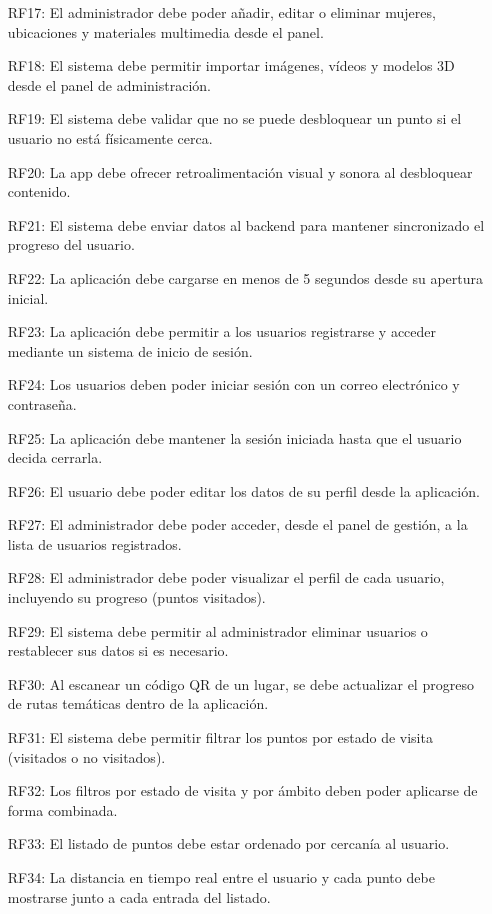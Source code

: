\begin{itemize}
\item[RF17:] El administrador debe poder añadir, editar o eliminar mujeres, ubicaciones y materiales multimedia desde el panel.
\item[RF18:] El sistema debe permitir importar imágenes, vídeos y modelos 3D desde el panel de administración.
\item[RF19:] El sistema debe validar que no se puede desbloquear un punto si el usuario no está físicamente cerca.
\item[RF20:] La app debe ofrecer retroalimentación visual y sonora al desbloquear contenido.
\item[RF21:] El sistema debe enviar datos al backend para mantener sincronizado el progreso del usuario.
\item[RF22:] La aplicación debe cargarse en menos de 5 segundos desde su apertura inicial.
\item[RF23:] La aplicación debe permitir a los usuarios registrarse y acceder mediante un sistema de inicio de sesión.
\item[RF24:] Los usuarios deben poder iniciar sesión con un correo electrónico y contraseña.
\item[RF25:] La aplicación debe mantener la sesión iniciada hasta que el usuario decida cerrarla.
\item[RF26:] El usuario debe poder editar los datos de su perfil desde la aplicación.
\item[RF27:] El administrador debe poder acceder, desde el panel de gestión, a la lista de usuarios registrados.
\item[RF28:] El administrador debe poder visualizar el perfil de cada usuario, incluyendo su progreso (puntos visitados).
\item[RF29:] El sistema debe permitir al administrador eliminar usuarios o restablecer sus datos si es necesario.
\item[RF30:] Al escanear un código QR de un lugar, se debe actualizar el progreso de rutas temáticas dentro de la aplicación.
\item[RF31:] El sistema debe permitir filtrar los puntos por estado de visita (visitados o no visitados).
\item[RF32:] Los filtros por estado de visita y por ámbito deben poder aplicarse de forma combinada.
\item[RF33:] El listado de puntos debe estar ordenado por cercanía al usuario.
\item[RF34:] La distancia en tiempo real entre el usuario y cada punto debe mostrarse junto a cada entrada del listado.
\end{itemize}

